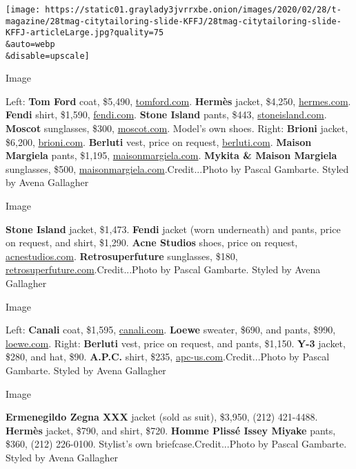 \texttt{[image: https://static01.graylady3jvrrxbe.onion/images/2020/02/28/t-magazine/28tmag-citytailoring-slide-KFFJ/28tmag-citytailoring-slide-KFFJ-articleLarge.jpg?quality=75\\\&auto=webp\\\&disable=upscale]}

Image

Left: \textbf{Tom Ford} coat, \$5,490,
\href{https://www.tomford.com/}{tomford.com}. \textbf{Hermès} jacket,
\$4,250, \href{https://www.hermes.com/us/en/}{hermes.com}.
\textbf{Fendi} shirt, \$1,590,
\href{https://www.fendi.com/us}{fendi.com}. \textbf{Stone Island} pants,
\$443, \href{https://www.stoneisland.com/us}{stoneisland.com}.
\textbf{Moscot} sunglasses, \$300,
\href{https://moscot.com/}{moscot.com}. Model's own shoes. Right:
\textbf{Brioni} jacket, \$6,200,
\href{https://www.brioni.com/us}{brioni.com}. \textbf{Berluti} vest,
price on request,
\href{https://www.berluti.com/en-us/homepage/}{berluti.com}.
\textbf{Maison Margiela} pants, \$1,195,
\href{https://www.maisonmargiela.com/us}{maisonmargiela.com}.
\textbf{Mykita \& Maison Margiela} sunglasses, \$500,
\href{https://www.maisonmargiela.com/om/lp_mykita_section}{maisonmargiela.com}.Credit...Photo
by Pascal Gambarte. Styled by Avena Gallagher

Image

\textbf{Stone Island} jacket, \$1,473. \textbf{Fendi} jacket (worn
underneath) and pants, price on request, and shirt, \$1,290.
\textbf{Acne Studios} shoes, price on request,
\href{https://www.acnestudios.com/us/en/home}{acnestudios.com}.
\textbf{Retrosuperfuture} sunglasses, \$180,
\href{https://retrosuperfuture.com/}{retrosuperfuture.com}.Credit...Photo
by Pascal Gambarte. Styled by Avena Gallagher

Image

Left: \textbf{Canali} coat, \$1,595,
\href{https://www.canali.com/en_us/homepage.html}{canali.com}.
\textbf{Loewe} sweater, \$690, and pants, \$990,
\href{https://www.loewe.com/usa/en/home}{loewe.com}. Right:
\textbf{Berluti} vest, price on request, and pants, \$1,150.
\textbf{Y-3} jacket, \$280, and hat, \$90. \textbf{A.P.C.} shirt, \$235,
\href{https://www.apc-us.com/}{apc-us.com}.Credit...Photo by Pascal
Gambarte. Styled by Avena Gallagher

Image

\textbf{Ermenegildo Zegna XXX} jacket (sold as suit), \$3,950, (212)
421-4488. \textbf{Hermès} jacket, \$790, and shirt, \$720. \textbf{Homme
Plissé Issey Miyake} pants, \$360, (212) 226-0100. Stylist's own
briefcase.Credit...Photo by Pascal Gambarte. Styled by Avena Gallagher

